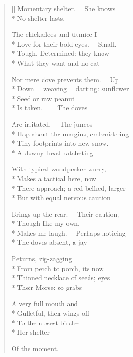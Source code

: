 \begin{verse}[\versewidth]
Momentary shelter.   She knows\\*
No shelter lasts.

The chickadees and titmice I\\*
Love for their bold eyes.   Small.\\*
Tough. Determined: they know\\*
What they want and no cat

Nor mere dove prevents them.   Up\\*
Down   weaving   darting: sunflower\\*
Seed or raw peanut\\*
Is taken.     The doves

Are irritated.   The juncos\\*
Hop about the margins, embroidering\\*
Tiny footprints into new snow.\\*
A downy, head ratcheting

With typical woodpecker worry,\\*
Makes a tactical here, now\\*
There approach; a red-bellied, larger\\*
But with equal nervous caution

Brings up the rear.   Their caution,\\*
Though like my own,\\*
Makes me laugh.   Perhaps noticing\\*
The doves absent, a jay

Returns, zig-zagging\\*
From perch to porch, its now\\*
Thinned necklace of seeds; eyes\\*
Their Morse: so grabs

A very full mouth and\\*
Gulletful, then wings off\\*
To the closest birch--\\*
Her shelter

Of the moment.
\end{verse}
